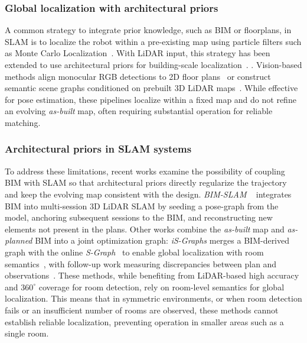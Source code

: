 \subsubsection*{\textbf{Global localization with architectural priors}}
A common strategy to integrate prior knowledge, such as BIM or floorplans, in SLAM is to localize the robot within a pre-existing map using particle filters such as Monte Carlo Localization~\cite{dellaert1999monte}. With LiDAR input, this strategy has been extended to use architectural priors for building-scale localization~\cite{blum_precise_2021}.
.
Vision-based methods align monocular RGB detections to 2D floor plans~\cite{zimmerman_constructing_2023} or construct semantic scene graphs conditioned on prebuilt 3D LiDAR maps~\cite{longo2025pixels}. 
While effective for pose estimation, these pipelines localize within a fixed map and do not refine an evolving \textit{as-built} map, often requiring substantial operation for reliable matching.

\subsubsection*{\textbf{Architectural priors in SLAM systems}}
To address these limitations, recent works examine the possibility of coupling BIM with SLAM so that architectural priors directly regularize the trajectory and keep the evolving map consistent with the design. \textit{BIM-SLAM} ~\cite{torres2024bim} integrates BIM into multi-session 3D LiDAR SLAM by seeding a pose-graph from the model, anchoring subsequent sessions to the BIM, and reconstructing new elements not present in the plans. 
Other works combine the \textit{as-built} map and \textit{as-planned} BIM into a joint optimization graph: \textit{iS-Graphs} merges a BIM-derived graph with the online \textit{S-Graph}~\cite{bavle2025s} to enable global localization with room semantics~\cite{isgraphs}, with follow-up work measuring discrepancies between plan and observations~\cite{disgraphs}.
These methods, while benefiting from LiDAR-based high accuracy and $360^\circ$ coverage for room detection, rely on room-level semantics for global localization. This means that in symmetric environments, or when room detection fails or an insufficient number of rooms are observed, these methods cannot establish reliable localization, preventing operation in smaller areas such as a single room.


